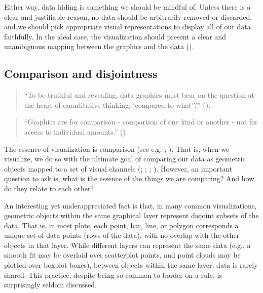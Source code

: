 \documentclass[
  openany]{book}
\theoremstyle{definition}
\theoremstyle{definition}
\theoremstyle{definition}
\theoremstyle{definition}
\theoremstyle{remark}
\begin{document}
Either way, data hiding is something we should be mindful of. Unless there is a clear and justifiable reason, no data should be arbitrarily removed or discarded, and we should pick appropriate visual representations to display all of our data faithfully. In the ideal case, the visualization should present a clear and unambiguous mapping between the graphics and the data ().

\subsection{Comparison and disjointness}\label{comparison-disjointness}

\begin{quote}
``To be truthful and revealing, data graphics must bear on the question at the heart of quantitative thinking: `compared to what'?'' ().
\end{quote}

\begin{quote}
``Graphics are for comparison - comparison of one kind or another - not for access to individual amounts.'' ()
\end{quote}

The essence of visualization is comparison (see e.g. ; ). That is, when we visualize, we do so with the ultimate goal of comparing our data as geometric objects mapped to a set of visual channels (; ; ; ). However, an important question to ask is, what is the essence of the things we are comparing? And how do they relate to each other?

An interesting yet underappreciated fact is that, in many common visualizations, geometric objects within the same graphical layer represent disjoint subsets of the data. That is, in most plots, each point, bar, line, or polygon corresponds a unique set of data points (rows of the data), with no overlap with the other objects in that layer. While different layers can represent the same data (e.g., a smooth fit may be overlaid over scatterplot points, and point clouds may be plotted over boxplot boxes), between objects within the same layer, data is rarely shared. This practice, despite being so common to border on a rule, is surprisingly seldom discussed.
\end{document}
